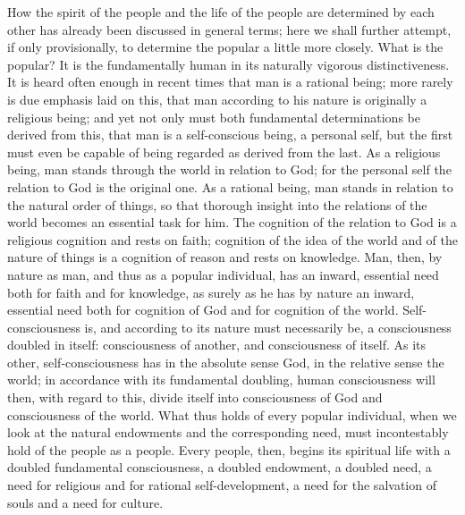 \documentclass[12pt]{book}
\newcommand{\opage}[1]{\marginnote{\footnotesize\textit{[#1]}}}
\begin{document}
How the spirit of the people and the life of the people are determined
by each other has already been discussed in general terms; here we shall
further attempt, if only provisionally, to determine the popular a
little more closely. What is the popular? It is the fundamentally human
in its naturally vigorous distinctiveness. It is heard often enough in
recent times that man is a rational being; more rarely is due emphasis
laid on this, that man according to his nature is originally a religious
being; and yet not only must both fundamental determinations be derived
from this, that man is a self-conscious being, a personal self, but the
first must even be capable of being regarded as derived from the last.
As a religious being, man stands through the world in relation to God;
for the personal self the relation to God is the original one. As a
rational being, man stands in relation to the natural order of things,
so that thorough insight into the relations of the world becomes an
essential task for him. The cognition of the relation to God is a
religious cognition and rests on faith; cognition of the idea of the
world and of the nature of things is a cognition of reason and rests on
knowledge. Man, then, by nature as man, and thus as a popular individual,
has an inward, essential need both for faith and for knowledge, as surely
as he has by nature an inward, essential need both for cognition of God
and for cognition of the world.
\opage{48}\setcounter{footnote}{0}%
Self-consciousness is, and according to its nature must necessarily be,
a consciousness doubled in itself: consciousness of another, and
consciousness of itself. As its other, self-consciousness has in the
absolute sense God, in the relative sense the world; in accordance with
its fundamental doubling, human consciousness will then, with regard to
this, divide itself into consciousness of God and consciousness of the
world. What thus holds of every popular individual, when we look at the
natural endowments and the corresponding need, must incontestably hold
of the people as a people. Every people, then, begins its spiritual life
with a doubled fundamental consciousness, a doubled endowment, a doubled
need, a need for religious and for rational self-development, a need for
the salvation of souls and a need for culture.
\end{document}
